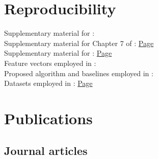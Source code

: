\section*{Reproducibility}
\label{sec:reproducibility}

Supplementary material for : 
\\
Supplementary material for Chapter 7 of : \href{OSNNet.html}{Page}
\\
Supplementary material for : \href{oscmi.html}{Page}
\\
Feature vectors employed in : 
\\
Proposed algorithm and baselines employed in : 
\\
Datasets employed in : \href{dataset-VLPL.html}{Page}

\section*{Publications}

\subsection*{Journal articles}

